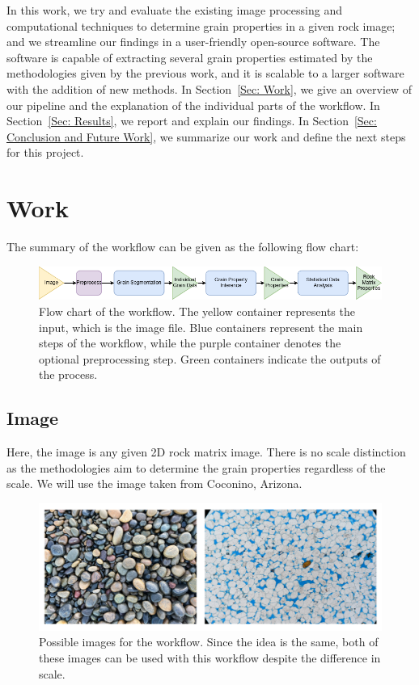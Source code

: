 \documentclass{article}
\begin{document}
In this work, we try and evaluate the existing image processing and computational techniques to determine grain properties in a given rock image; and we streamline our findings in a user-friendly open-source software. The software is capable of extracting several grain properties estimated by the methodologies given by the previous work, and it is scalable to a larger software with the addition of new methods. In Section~\ref{Sec: Work}, we give an overview of our pipeline and the explanation of the individual parts of the workflow. In Section~\ref{Sec: Results}, we report and explain our findings. In Section~\ref{Sec: Conclusion and Future Work}, we summarize our work and define the next steps for this project.
\section{Work}{\label{Sec: Work}}

The summary of the workflow can be given as the following flow chart:

\begin{figure}[H]
    \centering
    \includegraphics[width=\textwidth]{workflow_diagram.png}
    \caption{Flow chart of the workflow. The yellow container represents the input, which is the image file. Blue containers represent the main steps of the workflow, while the purple container denotes the optional preprocessing step. Green containers indicate the outputs of the process.}
    \label{fig:workflow_diagram}
\end{figure}

\subsection{Image}
Here, the image is any given 2D rock matrix image. There is no scale distinction as the methodologies aim to determine the grain properties regardless of the scale. We will use the image taken from Coconino, Arizona.

\begin{figure}[H]
    \centering
    \includegraphics[width=\textwidth]{rock_samples.png}
    \caption{Possible images for the workflow. Since the idea is the same, both of these images can be used with this workflow despite the difference in scale.}
    \label{fig:rock_samples}
\end{figure}
\end{document}
